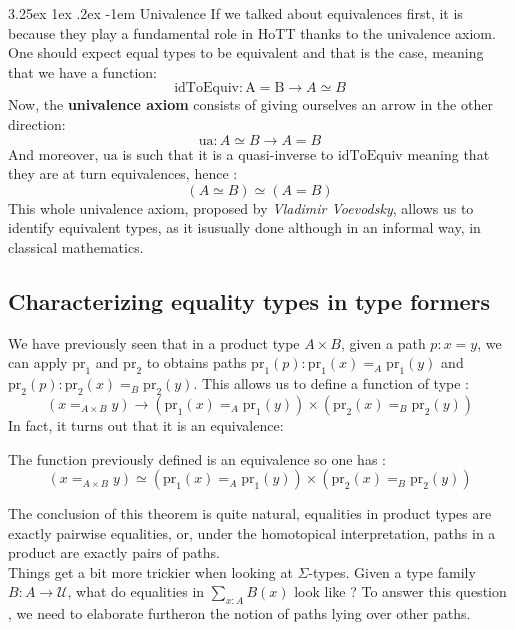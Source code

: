 \documentclass{report}
\makeatletter
\renewcommand\paragraph{\@startsection{paragraph}{5}{\z@}%
  {3.25ex \@plus1ex \@minus.2ex}%
  {-1em}%
  {\normalfont\normalsize\bfseries}}
\makeatother
\begin{document}
\paragraph{Univalence}
If we talked about equivalences first, it is because they play a fundamental role in HoTT thanks to the univalence axiom. One should expect equal types to be equivalent and that is the case, meaning that we have a function: 
$$\mathrm{idToEquiv : A = B \rightarrow} A \simeq B$$
Now, the \textbf{univalence axiom} consists of giving ourselves an arrow in the other direction:
$$\mathrm{ua} : A \simeq B \rightarrow A = B$$
And moreover, $\mathrm{ua}$ is such that it is a quasi-inverse to $\mathrm{idToEquiv}$ meaning that they are at turn equivalences, hence : 
$$(A \simeq B) \simeq  (A = B)$$
This whole univalence axiom, proposed by \textit{Vladimir Voevodsky}, allows us to identify equivalent types, as it isusually done  although in an informal way, in classical mathematics. 
\subsection{Characterizing equality types in type formers}
We have previously seen that in a product type $A \times B$, given a path $p : x=y$, we can apply $\mathrm{pr}_1$ and $\mathrm{pr}_2$ to obtains paths $\mathrm{pr}_1(p) : \mathrm{pr}_1(x)=_A \mathrm{pr}_1(y)$ and $\mathrm{pr}_2(p) : \mathrm{pr}_2(x)=_B \mathrm{pr}_2(y)$. This allows us to define a function of type : 
$$ (x =_{A\times B} y) \rightarrow (\mathrm{pr}_1(x)=_A \mathrm{pr}_1(y)) \times (\mathrm{pr}_2(x)=_B \mathrm{pr}_2(y))$$
In fact, it turns out that it is an equivalence:
\begin{theorem}
The function previously defined is an equivalence so one has :
$$(x=_{A \times B} y) \simeq (\mathrm{pr}_1(x)=_A \mathrm{pr}_1(y)) \times (\mathrm{pr}_2(x)=_B \mathrm{pr}_2(y))$$
\end{theorem}
The conclusion of this theorem is quite natural, equalities in product types are exactly pairwise equalities, or, under the homotopical interpretation, paths in a product are exactly pairs of paths.\\
Things get a bit more trickier when looking at $\Sigma$-types. Given a type family $B : A \rightarrow \mathcal{U}$, what do equalities in $\sum_{x : A} B(x)$ look like ? To answer this question , we need to elaborate furtheron the notion of paths lying over other paths.
\end{document}
